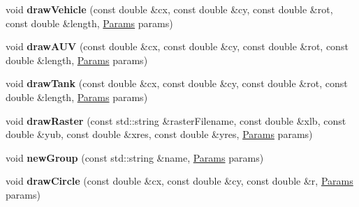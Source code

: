 \begin{DoxyCompactItemize}
\item 
\mbox{\label{namespacevibes_a534947550c6d4dde3b1d16498cd3e7fd}} 
void {\bfseries draw\+Vehicle} (const double \&cx, const double \&cy, const double \&rot, const double \&length, \hyperlink{classvibes_1_1_params}{Params} params)
\item 
\mbox{\label{namespacevibes_ade40d1d76522a353ddc783104d9d26cb}} 
void {\bfseries draw\+A\+UV} (const double \&cx, const double \&cy, const double \&rot, const double \&length, \hyperlink{classvibes_1_1_params}{Params} params)
\item 
\mbox{\label{namespacevibes_a4a6e7fa6e33f83659bb2ff459902066f}} 
void {\bfseries draw\+Tank} (const double \&cx, const double \&cy, const double \&rot, const double \&length, \hyperlink{classvibes_1_1_params}{Params} params)
\item 
\mbox{\label{namespacevibes_aa1c1d1250c16d201c745e66efc4baa4c}} 
void {\bfseries draw\+Raster} (const std\+::string \&raster\+Filename, const double \&xlb, const double \&yub, const double \&xres, const double \&yres, \hyperlink{classvibes_1_1_params}{Params} params)
\item 
\mbox{\label{namespacevibes_a844aa7079b495a4ac028495bdd76ffdf}} 
void {\bfseries new\+Group} (const std\+::string \&name, \hyperlink{classvibes_1_1_params}{Params} params)
\item 
\mbox{\label{namespacevibes_aca8f238d2d446d1663e63577dc584a2b}} 
void {\bfseries draw\+Circle} (const double \&cx, const double \&cy, const double \&r, \hyperlink{classvibes_1_1_params}{Params} params)
\end{DoxyCompactItemize}
